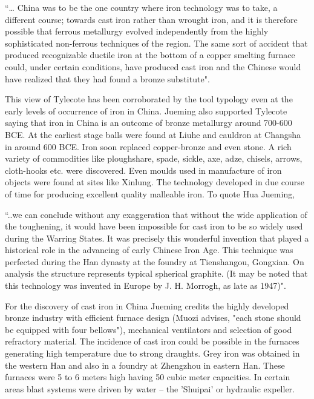 {\footnotesize “… China was to be the one country where iron technology was to take, a different course; towards cast iron rather than wrought iron, and it is therefore possible that ferrous metallurgy evolved independently from the highly sophisticated non-ferrous techniques of the region. The same sort of accident that produced recognizable ductile iron at the bottom of a copper smelting furnace could, under certain conditions, have produced cast iron and the Chinese would have realized that they had found a bronze substitute". }

This view of Tylecote has been corroborated by the tool typology even at the early levels of occurrence of iron in China. Jueming also supported Tylecote saying that iron in China is an outcome of bronze metallurgy around 700-600 BCE. At the earliest stage balls were found at Liuhe and cauldron at Changsha in around 600 BCE. Iron soon replaced copper-bronze and even stone. A rich variety of commodities like ploughshare, spade, sickle, axe, adze, chisels, arrows, cloth-hooks etc. were discovered. Even moulds used in manufacture of iron objects were found at sites like Xinlung. The technology developed in due course of time for producing excellent quality malleable iron. To quote Hua Jueming, 

{\footnotesize “..we can conclude without any exaggeration that without the wide application of the toughening, it would have been impossible for cast iron to be so widely used during the Warring States. It was precisely this wonderful invention that played a historical role in the advancing of early Chinese Iron Age. This technique was perfected during the Han dynasty at the foundry at Tienshangou, Gongxian. On analysis the structure represents typical spherical graphite. (It may be noted that this technology was invented in Europe by J. H. Morrogh, as late as 1947)".}

For the discovery of cast iron in China Jueming credits the highly developed bronze industry with efficient furnace design (Muozi advises, "each stone should be equipped with four bellows"), mechanical ventilators and selection of good refractory material. The incidence of cast iron could be possible in the furnaces generating high temperature due to strong draughts. Grey iron was obtained in the western Han and also in a foundry at Zhengzhou in eastern Han. These furnaces were 5 to 6 meters high having 50 cubic meter capacities. In certain areas blast systems were driven by water – the 'Shuipai' or hydraulic expeller.

